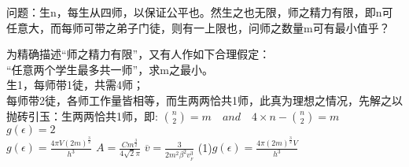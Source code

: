 \documentclass[10pt]{article}
\begin{document}
\setlength{\parindent}{2em}
\par
问题：生n，每生从四师，以保证公平也。然生之也无限，师之精力有限，即n可任意大，而每师可带之弟子门徒，则有一上限也，问师之数量m可有最小值乎？
\par
为精确描述“师之精力有限”，又有人作如下合理假定：\\
   “任意两个学生最多共一师”，求m之最小。\\
   生1，每师带1徒，共需4师；\\
   每师带2徒，各师工作量皆相等，而生两两恰共1师，此真为理想之情况，先解之以抛砖引玉：生两两恰共1师，即:
$ {n \choose 2}=m \quad and \quad 4\times n-{n \choose 2}=m $
\\
\(g(\epsilon)=2\)\\
\(g(\epsilon)=\frac{4\pi V(2m)^\frac{3}{2}}{h^3}\)
\(A=\frac{C m^\frac{3}{2}}{4 \sqrt{2} \pi}\)
\( \overline{v}=\frac{3}{2m^2\beta^2 v_{_F}^3}\)
(1)\(g(\epsilon)=\frac{4\pi(2m)^\frac{3}{2}V}{h^3}\)
\end{document}
